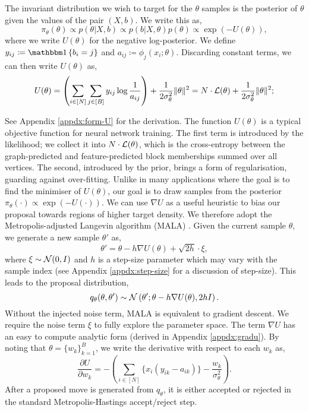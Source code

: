 The invariant distribution we wish to target for the $\theta$ samples is the posterior of $\theta$ given the values of the pair $(X, b)$. 
We write this as,
%
\begin{equation}
	\pi_\theta(\theta) \propto p(\theta | X, b) \propto p(b | X, \theta) p(\theta) \propto  \exp \left( - U(\theta) \right),
	\label{eq:U}
\end{equation}
%
where we write $U(\theta)$ for the negative log-posterior. We define $y_{ij} \coloneqq \one \left\{ b_i = j \right\}$ and $a_{ij} \coloneqq \phi_j(x_i; \theta)$. 
Discarding constant terms, we can then write $U(\theta)$ as,
%
\begin{equation}
	U(\theta) = \left( \sum_{i \in [N]} \sum_{j \in [B]} y_{ij} \log \frac{1}{a_{ij}} \right)
	+ \frac{1}{2\sigma_\theta^2} \|\theta\|^2 = N \cdot \mathcal{L}(\theta) + \frac{1}{2\sigma_\theta^2} \|\theta\|^2;
	\label{eqn:U-form}
\end{equation}

See Appendix \ref{appdx:form-U} for the derivation. The function $U(\theta)$ is a typical objective function for neural network training. The first term is introduced by the likelihood; we collect it into $N \cdot \mathcal{L}(\theta)$, which is the cross-entropy between the graph-predicted and feature-predicted block memberships summed over all vertices. 
The second, introduced by the prior, brings a form of regularisation, guarding against over-fitting. Unlike in many applications where the goal 
is to find the minimiser of $U(\theta)$, our goal is to draw samples from the posterior $\pi_\theta(\cdot) \propto \exp(-U(\cdot))$. We can use $\nabla U$ as a useful heuristic to bias our proposal towards regions of higher target density. We therefore adopt the Metropolis-adjusted Langevin algorithm (MALA) \cite{mala-tweedie}. Given the current sample $\theta$, we generate 
a new sample $\theta'$ as,
%
\begin{equation*}
	\theta' = \theta - h \nabla U(\theta) + \sqrt{2h} \cdot \xi,
\end{equation*}
%
where $\xi \sim \mathcal{N}(0, I)$ and $h$ is a step-size parameter 
which may vary with the sample index (see Appendix \ref{appdx:step-size} for a discussion of step-size).
This leads to the proposal distribution,
\begin{equation*}
	q_\theta(\theta, \theta') \sim \mathcal{N} \left( \theta' ; \theta - h \nabla U(\theta), 2h I \right).
\end{equation*}
%
Without the injected noise term, MALA is equivalent to gradient descent. We require the noise term $\xi$ to fully explore the parameter space. 
The term $\nabla U$ has an easy to compute analytic form (derived in Appendix \ref{appdx:gradu}). By noting that $\theta = \{w_k\}_{k=1}^{B}$, we write the derivative with respect to each $w_k$ as,
%
\begin{equation}
	\frac{\partial U}{\partial w_k} = - \left( \sum_{i \in [N]} \Big\{ x_i (y_{ik} - a_{ik}) \Big\} - \frac{w_k}{\sigma_\theta^2} \right).
	\label{eqn:U-derivative}
\end{equation}
%
After a proposed move is generated from $q_\theta$,
it is either accepted or rejected in the standard
Metropolis-Hastings accept/reject step.

